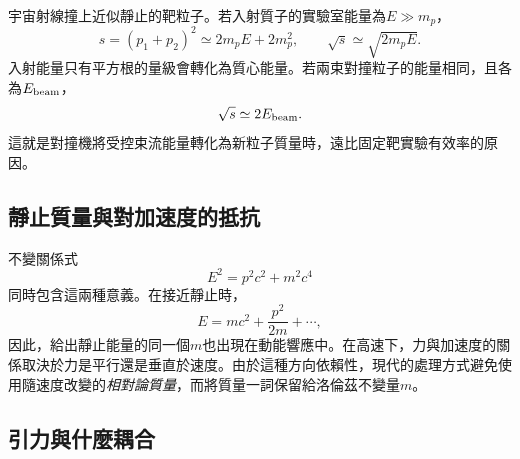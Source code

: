 宇宙射線撞上近似靜止的靶粒子。若入射質子的實驗室能量為\(E\gg m_p\)，
\begin{equation}
  s=(p_1+p_2)^2
  \simeq2m_pE+2m_p^2,
  \qquad
  \sqrt{s}\simeq\sqrt{2m_pE}.
  \label{eq:l09-fixed-target-s}
\end{equation}
入射能量只有平方根的量級會轉化為質心能量。若兩束對撞粒子的能量相同，且各為\(E_{\rm beam}\)，
\begin{equation}
  \sqrt{s}\simeq2E_{\rm beam}.
  \label{eq:l09-collider-s}
\end{equation}
這就是對撞機將受控束流能量轉化為新粒子質量時，遠比固定靶實驗有效率的原因。

\begin{classroomqa}
\end{classroomqa}

\subsection{靜止質量與對加速度的抵抗}

\begin{classroomqa}
\end{classroomqa}

不變關係式
\begin{equation}
  E^2=p^2c^2+m^2c^4
  \label{eq:l09-energy-momentum}
\end{equation}
同時包含這兩種意義。在接近靜止時，
\begin{equation}
  E=mc^2+\frac{p^2}{2m}+\cdots,
\end{equation}
因此，給出靜止能量的同一個\(m\)也出現在動能響應中。在高速下，力與加速度的關係取決於力是平行還是垂直於速度。由於這種方向依賴性，現代的處理方式避免使用隨速度改變的\emph{相對論質量}，而將質量一詞保留給洛倫茲不變量\(m\)。

\subsection{引力與什麼耦合}

